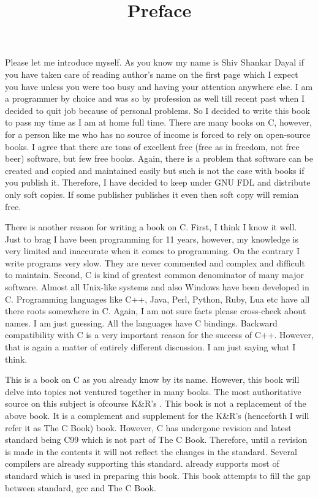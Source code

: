 


\title{Preface}
Please let me introduce myself. As you know my name is Shiv Shankar Dayal if
you have taken care of reading author's name on the first page which I expect
you have unless you were too busy and having your attention anywhere else.
I am a programmer by choice and was so by profession as well till recent past
when I decided to quit job because of personal problems. So I decided to write
this book to pass my time as I am at home full time. There are many books on C,
however, for a person like me who has no source of income is forced to rely
on open-source books. I agree that there are tons of excellent free (free as in
freedom, not free beer) software, but few free books. Again, there is a problem
that software can be created and copied and maintained easily but such is not
the case with books if you publish it. Therefore, I have decided to keep under
GNU FDL and distribute only soft copies. If some publisher publishes it even
then soft copy will remian free.

There is another reason for writing a book on C. First, I think I know it well.
Just to brag I have been programming for 11 years, however, my knowledge is
very limited and inaccurate when it comes to programming. On the contrary I
write programs very slow. They are never commented and complex and difficult
to maintain. Second, C is kind of greatest common denominator of many major
software. Almost all Unix-like systems and also Windows have been developed
in C. Programming languages like C++, Java, Perl, Python, Ruby, Lua etc have all
there roots somewhere in C. Again, I am not sure facts please cross-check
about names. I am just guessing. All the languages have C bindings. Backward
compatibility with C is a very important reason for the success of C++.
However, that is again a matter of entirely different discussion. I am just
saying what I think.

This is a book on C as you already know by its name. However, this book will
delve into topics not ventured together in many books. The most authoritative
source on this subject is ofcourse K\&R's . This book is not a replacement of the above book. It is a complement
and supplement for the K\&R's (henceforth I will refer it as The C Book) book.
However, C has undergone revision and latest standard being C99 which is not
part of The C Book. Therefore, until a revision is made in the contents it
will not reflect the changes in the standard. Several compilers are already
supporting this standard.  already supports most of standard which is
used in preparing this book. This book attempts to fill the gap between
standard, gcc and The C Book.


